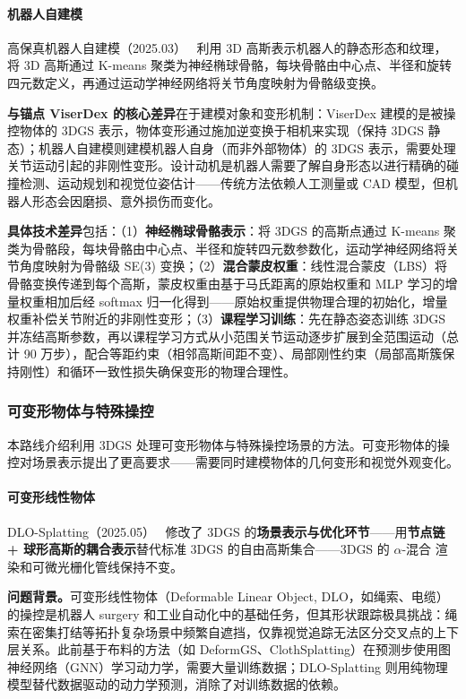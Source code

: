 \paragraph{机器人自建模}

高保真机器人自建模（2025.03）~\cite{2503_05398} 利用 3D 高斯表示机器人的静态形态和纹理，将 3D 高斯通过 K-means 聚类为神经椭球骨骼，每块骨骼由中心点、半径和旋转四元数定义，再通过运动学神经网络将关节角度映射为骨骼级变换。

\textbf{与锚点 ViserDex 的核心差异}在于建模对象和变形机制：ViserDex 建模的是被操控物体的 3DGS 表示，物体变形通过施加逆变换于相机来实现（保持 3DGS 静态）；机器人自建模则建模机器人自身（而非外部物体）的 3DGS 表示，需要处理关节运动引起的非刚性变形。设计动机是机器人需要了解自身形态以进行精确的碰撞检测、运动规划和视觉位姿估计——传统方法依赖人工测量或 CAD 模型，但机器人形态会因磨损、意外损伤而变化。

\textbf{具体技术差异}包括：（1）\textbf{神经椭球骨骼表示}：将 3DGS 的高斯点通过 K-means 聚类为骨骼段，每块骨骼由中心点、半径和旋转四元数参数化，运动学神经网络将关节角度映射为骨骼级 SE(3) 变换；（2）\textbf{混合蒙皮权重}：线性混合蒙皮（LBS）将骨骼变换传递到每个高斯，蒙皮权重由基于马氏距离的原始权重和 MLP 学习的增量权重相加后经 softmax 归一化得到——原始权重提供物理合理的初始化，增量权重补偿关节附近的非刚性变形；（3）\textbf{课程学习训练}：先在静态姿态训练 3DGS 并冻结高斯参数，再以课程学习方式从小范围关节运动逐步扩展到全范围运动（总计 90 万步），配合等距约束（相邻高斯间距不变）、局部刚性约束（局部高斯簇保持刚性）和循环一致性损失确保变形的物理合理性。

\subsubsection{可变形物体与特殊操控}

本路线介绍利用 3DGS 处理可变形物体与特殊操控场景的方法。可变形物体的操控对场景表示提出了更高要求——需要同时建模物体的几何变形和视觉外观变化。

\paragraph{可变形线性物体}

DLO-Splatting（2025.05）~\cite{2505_08644} 修改了 3DGS 的\textbf{场景表示与优化环节}——用\textbf{节点链 + 球形高斯的耦合表示}替代标准 3DGS 的自由高斯集合——3DGS 的 $\alpha$-混合 渲染和可微光栅化管线保持不变。

\textbf{问题背景。}可变形线性物体（Deformable Linear Object, DLO，如绳索、电缆）的操控是机器人 surgery 和工业自动化中的基础任务，但其形状跟踪极具挑战：绳索在密集打结等拓扑复杂场景中频繁自遮挡，仅靠视觉追踪无法区分交叉点的上下层关系。此前基于布料的方法（如 DeformGS、ClothSplatting）在预测步使用图神经网络（GNN）学习动力学，需要大量训练数据；DLO-Splatting 则用纯物理模型替代数据驱动的动力学预测，消除了对训练数据的依赖。


